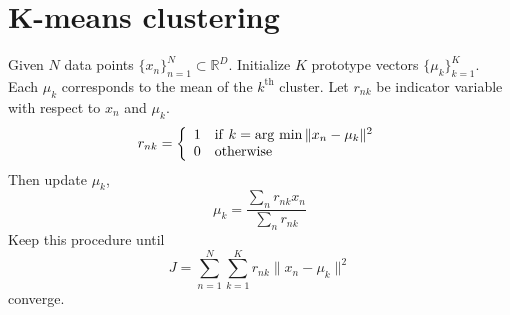 \documentclass[../main.tex]{subfiles}
\begin{document}
    \section{K-means clustering}
        Given $N$ data points $\{x_n\}_{n=1}^N\subset\mathbb{R}^D$. Initialize $K$ prototype vectors $\{\mu_k\}_{k=1}^K$. Each $\mu_k$ corresponds to the mean of the $k^\mathrm{th}$ cluster. Let $r_{nk}$ be indicator variable with respect to $x_n$ and $\mu_k$.
        \[
            r_{nk}=\left\{
                \begin{array}{ll}
                    1&\mathrm{if~}k=\operatorname*{arg~min}\|x_n-\mu_k\|^2\\
                    0&\mathrm{otherwise}
                \end{array}
            \right.
        \]
        Then update $\mu_k$,
        \[
            \mu_k = \frac{\sum_n r_{nk}x_n}{\sum_n r_{nk}}
        \]
        Keep this procedure until
        \[
            J = \sum_{n=1}^N\sum_{k=1}^Kr_{nk}\|x_n-\mu_k\|^2
        \]
        converge.
\end{document}
